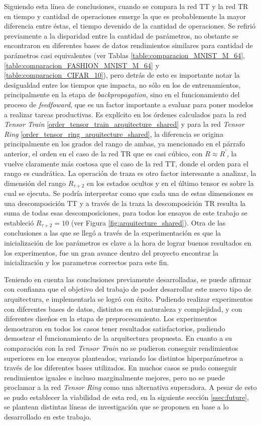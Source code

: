 \documentclass[spanish]{article}
\theoremstyle{definition}
\theoremstyle{remark}
\numberwithin{equation}{section}
\numberwithin{equation}{section} %
\begin{document}
Siguiendo esta línea de conclusiones, cuando se compara la red TT y la red TR en tiempo y cantidad de operaciones emerge la que es probablemente la mayor diferencia entre éstas, el tiempo devenido de la cantidad de operaciones. Se refirió previamente a la disparidad entre la cantidad de parámetros, no obstante se encontraron en diferentes bases de datos rendimientos similares para cantidad de parámetros casi equivalentes (ver Tablas \ref{table:comparacion_MNIST_M_64}, \ref{table:comparacion_FASHION_MNIST_M_64}  y \ref{table:comparacion_CIFAR_10}), pero detrás de esto es importante notar la desigualdad entre los tiempos que impacta, no sólo en los de entrenamientos, principalmente en la etapa de \textit{backpropagation}, sino en el funcionamiento del proceso de \textit{feedfoward}, que es un factor importante a evaluar para poner modelos a realizar tareas productivas. Es explícito en los órdenes calculados para la red \textit{Tensor Train} \eqref{order_tensor_train_arquitecture_shared} y para la red \textit{Tensor Ring} \eqref{order_tensor_ring_arquitecture_shared}, la diferencia se origina principalmente en los grados del rango de ambas, ya mencionado en el párrafo anterior, el orden en el caso de la red TR que es casi cúbico, con $R \approx R^\prime$, la vuelve claramente más costosa que el caso de la red TT, donde el orden para el rango es cuadrática. La operación de traza es otro factor interesante a analizar, la dimensión del rango $R_{\tau+2}$ en los estados ocultos y en el último tensor es sobre la cual se ejecuta. Se podría interpretar como que cada una de estas dimensiones es una descomposición TT y a través de la traza la descomposición TR resulta la suma de todas esas descomposiciones, para todos los ensayos de este trabajo se estableció $R_{\tau+2}=10$ (ver Figura \ref{fig:arquitecture_shared}). Otra de las conclusiones a las que se llegó a través de la experimentación es que la inicialización de los parámetros es clave a la hora de lograr buenos resultados en los experimentos, fue un gran avance dentro del proyecto encontrar la inicialización y los parametros correctos para este fin.     
\par
Teniendo en cuenta las conclusiones previamente desarrolladas, se puede afirmar con confianza que el objetivo del trabajo de poder desarrollar este nuevo tipo de arquitectura, e implementarla se logró con éxito. Pudiendo realizar experimentos con diferentes bases de datos, distintos en su naturaleza y complejidad, y con diferentes diseños en la etapa de preprocesamiento. Los experimentos demostraron en todos los casos tener resultados satisfactorios, pudiendo demostrar el funcionamiento de la arquitectura propuesta. En cuanto a su comparación con la red \textit{Tensor Train}  no se pudieron conseguir rendimientos superiores en los ensayos planteados, variando los distintos hiperparámetros a través de los diferentes bases utilizados. En muchos casos se pudo conseguir rendimientos iguales e incluso marginalmente mejores, pero no se puede proclamar a la red \textit{Tensor Ring} como una alternativa superadora. A pesar de esto se pudo establecer la viabilidad de esta red, en la siguiente sección \ref{ssec:future}, se plantean distintas líneas de investigación que se proponen en base a lo desarrollado en este trabajo.
\par
\end{document}
